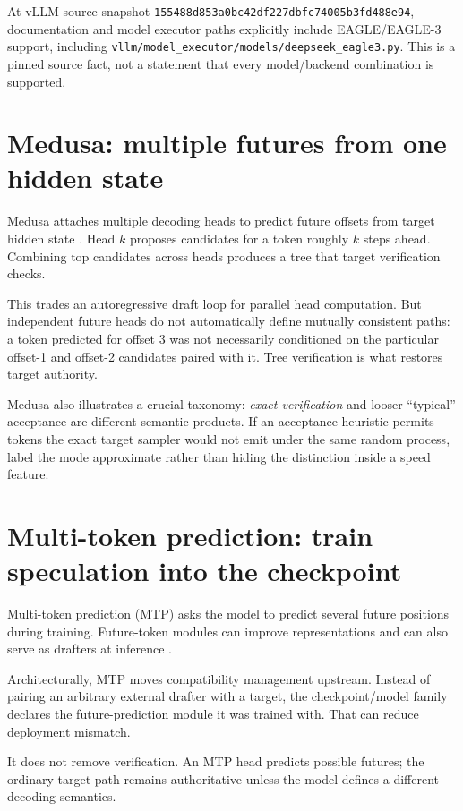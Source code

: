 At vLLM source snapshot
\texttt{155488d853a0bc42df227dbfc74005b3fd488e94}, documentation and model executor
paths explicitly include EAGLE/EAGLE-3 support, including
\texttt{vllm/model\_executor/models/deepseek\_eagle3.py}. This is a pinned source fact,
not a statement that every model/backend combination is supported.

\section{Medusa: multiple futures from one hidden state}

Medusa attaches multiple decoding heads to predict future offsets from target hidden
state \cite{cai2024medusa}. Head $k$ proposes candidates for a token roughly $k$ steps
ahead. Combining top candidates across heads produces a tree that target verification
checks.

This trades an autoregressive draft loop for parallel head computation. But independent
future heads do not automatically define mutually consistent paths: a token predicted
for offset 3 was not necessarily conditioned on the particular offset-1 and offset-2
candidates paired with it. Tree verification is what restores target authority.

Medusa also illustrates a crucial taxonomy: \emph{exact verification} and looser
``typical'' acceptance are different semantic products. If an acceptance heuristic
permits tokens the exact target sampler would not emit under the same random process,
label the mode approximate rather than hiding the distinction inside a speed feature.

\section{Multi-token prediction: train speculation into the checkpoint}

Multi-token prediction (MTP) asks the model to predict several future positions during
training. Future-token modules can improve representations and can also serve as
drafters at inference \cite{gloeckle2024mtp,deepseek2024v3}.

Architecturally, MTP moves compatibility management upstream. Instead of pairing an
arbitrary external drafter with a target, the checkpoint/model family declares the
future-prediction module it was trained with. That can reduce deployment mismatch.

It does not remove verification. An MTP head predicts possible futures; the ordinary
target path remains authoritative unless the model defines a different decoding
semantics.

